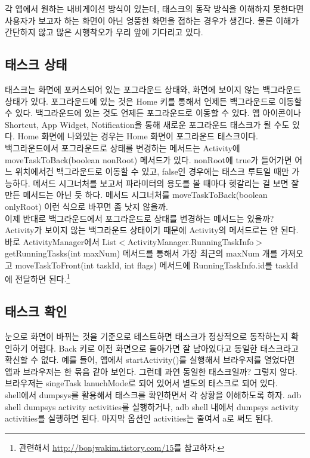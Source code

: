 각 앱에서 원하는 내비게이션 방식이 있는데, 태스크의 동작 방식을 이해하지 못한다면 사용자가 보고자 하는 화면이 아닌 엉뚱한 화면을 접하는 경우가 생긴다. 물론 이해가 간단하지 않고 많은 시행착오가 우리 앞에 기다리고 있다.

\subsection{태스크 상태}
태스크는 화면에 포커스되어 있는 포그라운드 상태와, 화면에 보이지 않는 백그라운드 상태가 있다. 포그라운드에 있는 것은 Home 키를 통해서 언제든 백그라운드로 이동할 수 있다.
백그라운드에 있는 것도 언제든 포그라운드로 이동할 수 있다. 앱 아이콘이나 Shortcut, App Widget, Notification을 통해 새로운 포그라운드 태스크가 될 수도 있다. Home 화면에 나와있는 경우는 Home 화면이 포그라운드 태스크이다.\\

백그라운드에서 포그라운드로 상태를 변경하는 메서드는 Activity에 moveTaskToBack(boolean nonRoot) 메서드가 있다. nonRoot에 true가 들어가면 어느 위치에서건 백그라운드로 이동할 수 있고, false인 경우에는 태스크 루트일 때만 가능하다. 
메서드 시그너처를 보고서 파라미터의 용도를 볼 때마다 헷갈리는 걸 보면 잘 만든 메서드는 아닌 듯 하다. 메서드 시그너처를 moveTaskToBack(boolean onlyRoot) 이런 식으로 바꾸면 좀 낫지 않을까. \\

이제 반대로 백그라운드에서 포그라운드로 상태를 변경하는 메서드는 있을까? 
Activity가 보이지 않는 백그라운드 상태이기 때문에 Activity의 메서드로는 안 된다.
바로 ActivityManager에서 
List$<$ActivityManager.Running\-TaskInfo$>$ getRunningTasks(int maxNum) 메서드를 통해서 가장 최근의 maxNum 개를 가져오고 moveTaskToFront(int taskId, int flags) 메서드에 RunningTaskInfo.id를 taskId에 전달하면 된다.\footnote{관련해서 \url{http://bonjwakim.tistory.com/15}를 참고하자.}

\subsection{태스크 확인}
눈으로 화면이 바뀌는 것을 기준으로 테스트하면 태스크가 정상적으로 동작하는지 확인하기 어렵다. Back 키로 이전 화면으로 돌아가면 잘 남아있다고 동일한 태스크라고 확신할 수 없다.
예를 들어, 앱에서 startActivity()를 실행해서 브라우저를 열었다면 앱과 브라우저는 한 묶음 같아 보인다. 그런데 과연 동일한 태스크일까? 그렇지 않다. 브라우저는 singeTask lanuchMode로 되어 있어서 별도의 태스크로 되어 있다.\\

shell에서 dumpsys를 활용해서 태스크를 확인하면서 각 상황을 이해하도록 하자.
adb shell dumpsys activity activities를 실행하거나, adb shell 내에서 dumpsys activity activities를 실행하면 된다. 마지막 옵션인 activities는 줄여서 a로 써도 된다.\\

